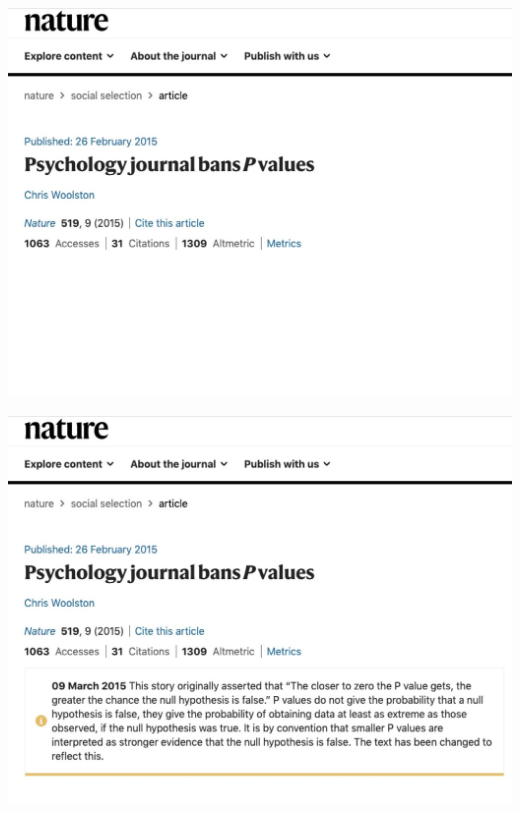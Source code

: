 \documentclass[11pt,english,handout]{beamer}
\begin{document}
\begin{frame}

\begin{center}
\includegraphics[scale=0.45]{p-values0.jpg}
\end{center}

\end{frame}

\begin{frame}

\vspace{0.8cm}
\begin{center}
\includegraphics[scale=0.45]{p-values.jpg}
\end{center}

\end{frame}
\end{document}
